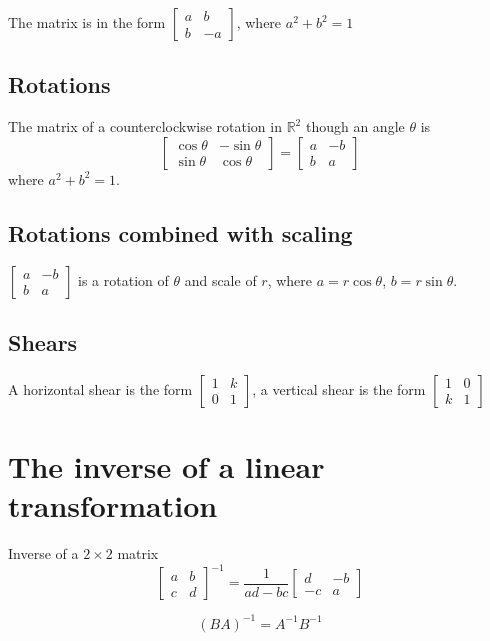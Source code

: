 \documentclass[letter]{article}
\newcommand{\R}{\mathbb{R}}
\begin{document}
The matrix is in the form 
$ \begin{bmatrix}
a&b\\
b&-a
\end{bmatrix}$, where $a^2+b^2 = 1$

\subsection{Rotations}
The matrix of a counterclockwise rotation in $\R^2$ though an angle $\theta$ is
\[
\begin{bmatrix}
\cos \theta&-\sin \theta\\
\sin \theta&\cos \theta
\end{bmatrix} 
= 
\begin{bmatrix}
a&-b\\
b&a
\end{bmatrix} 
\]
where $a^2+b^2 = 1$.

\subsection{Rotations combined with scaling}
$\begin{bmatrix}
a&-b\\
b&a
\end{bmatrix}$ is a rotation of $\theta$ and scale of $r$, where $a = r\cos\theta$, $b=r\sin\theta$.

\subsection{Shears}
A horizontal shear is the form $\begin{bmatrix}
1&k\\
0&1
\end{bmatrix}$, a vertical shear is the form $\begin{bmatrix}
1&0\\
k&1
\end{bmatrix}$

\section{The inverse of a linear transformation}
Inverse of a $2\times 2$ matrix 
\[
\begin{bmatrix}
a&b\\
c&d
\end{bmatrix}^{-1} = \frac{1}{ad-bc}
\begin{bmatrix}
d&-b\\
-c&a
\end{bmatrix}
\]

\[(BA)^{-1} =
A^{-1}B^{-1}
\]
\end{document}
